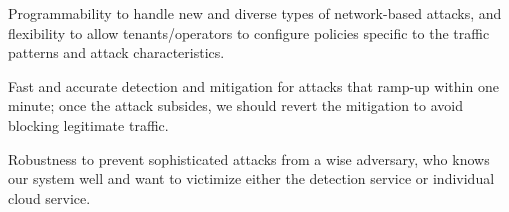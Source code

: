  Programmability to handle new and diverse types of network-based attacks, and flexibility to    
allow tenants/operators to configure policies %
specific to the traffic patterns and attack characteristics.

 Fast and accurate detection and mitigation for attacks that ramp-up within one minute; 
once the attack subsides, we should revert the mitigation to avoid blocking legitimate traffic. 

 Robustness to prevent sophisticated attacks from a wise adversary, who knows our system well and want to victimize either the detection service or individual cloud service. 



